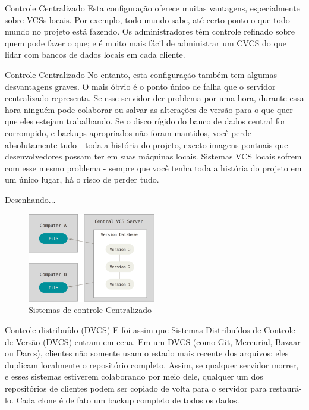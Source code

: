 \documentclass{beamer}
\begin{document}
\begin{frame}{Controle Centralizado} \justifying
      Esta configuração oferece muitas vantagens, especialmente sobre VCSs locais. Por exemplo, todo mundo sabe, até certo ponto o que todo mundo no projeto está fazendo. Os administradores têm controle refinado sobre quem pode fazer o que; e é muito mais fácil de administrar um CVCS do que lidar com bancos de dados locais em cada cliente.
\end{frame}

\begin{frame}{Controle Centralizado} \justifying
      No entanto, esta configuração também tem algumas desvantagens graves. O mais óbvio é o ponto único de falha que o servidor centralizado representa. Se esse servidor der problema por uma hora, durante essa hora ninguém pode colaborar ou salvar as alterações de versão para o que quer que eles estejam trabalhando. Se o disco rígido do banco de dados central for corrompido, e backups apropriados não foram mantidos, você perde absolutamente tudo - toda a história do projeto, exceto imagens pontuais que desenvolvedores possam ter em suas máquinas locais. Sistemas VCS locais sofrem com esse mesmo problema - sempre que você tenha toda a história do projeto em um único lugar, há o risco de perder tudo.
\end{frame}



\begin{frame}[fragile]{Desenhando...}
      \begin{figure}[H]
            \centerline{\includegraphics[width=0.5\textwidth]{assets/aula-tdsi-ifds-2023-05-24/controle-centralizado.png}}
            \caption{Sistemas de controle Centralizado}
        \end{figure}
\end{frame}

\begin{frame}{Controle distribuído (DVCS)} \justifying
      E foi assim que Sistemas Distribuídos de Controle de Versão (DVCS) entram em cena. Em um DVCS (como Git, Mercurial, Bazaar ou Darcs), clientes não somente usam o estado mais recente dos arquivos: eles duplicam localmente o repositório completo. Assim, se qualquer servidor morrer, e esses sistemas estiverem colaborando por meio dele, qualquer um dos repositórios de clientes podem ser copiado de volta para o servidor para restaurá-lo. Cada clone é de fato um backup completo de todos os dados.
\end{frame}
\end{document}
